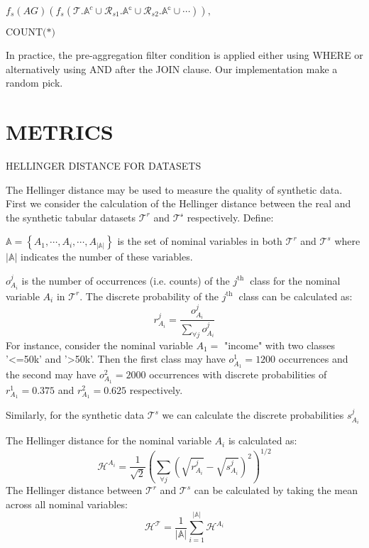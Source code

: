 \documentclass[10pt]{article}
\begin{document}
$f_s(AG)(f_s(\mathcal{T}.\mathbb{A}^c \cup \mathcal{R}_{s1}.\mathbb{{A}^c} \cup \mathcal{R}_{s2}.\mathbb{{A}^c} \cup \cdots )),$

$\text{COUNT(*)}$

In practice, the pre-aggregation filter condition is applied either using WHERE or alternatively using  AND after the JOIN clause. Our implementation make a random pick.   














\section{METRICS}
HELLINGER DISTANCE FOR DATASETS

The Hellinger distance may be used to measure the quality of synthetic data. First we consider the calculation of the Hellinger distance between the real and the synthetic tabular datasets $\mathcal{T}^{r}$ and $\mathcal{T}^{\mathcal{s}}$ respectively. Define:

$\mathbb{A}=\left\{A_{1}, \cdots, A_{i}, \cdots, A_{|\mathbb{A}|}\right\}$ is the set of nominal variables in both $\mathcal{T}^{r}$ and $\mathcal{T}^{s}$ where $|\mathbb{A}|$ indicates the number of these variables.

$o_{A_{i}}^{j}$ is the number of occurrences (i.e. counts) of the $j^{\text {th }}$ class for the nominal variable $A_{i}$ in $\mathcal{T}^{r}$. The discrete probability of the $j^{\text {th }}$ class can be calculated as:
$$
r_{A_{i}}^{j}=\frac{o_{A_{i}}^{j}}{\sum_{\forall j} o_{A_{i}}^{j}}
$$
For instance, consider the nominal variable $A_{1}=$ "income" with two classes '<=50k' and '>50k'. Then the first class may have $o_{A_{1}}^{1}=1200$ occurrences and the second may have $o_{A_{1}}^{2}=2000$ occurrences with discrete probabilities of $r_{A_{1}}^{1}=0.375$ and $r_{A_{1}}^{2}=0.625$ respectively.

Similarly, for the synthetic data $\mathcal{T}^{s}$ we can calculate the discrete probabilities $s_{A_{i}}^{j}$

The Hellinger distance for the nominal variable $A_{i}$ is calculated as:
$$
\mathcal{H}^{A_{i}}=\frac{1}{\sqrt{2}}\left(\sum_{\forall j}\left(\sqrt{r_{A_{i}}^{j}}-\sqrt{s_{A_{i}}^{j}}\right)^{2}\right)^{1 / 2}
$$
The Hellinger distance between $\mathcal{T}^{r}$ and $\mathcal{T}^{s}$ can be calculated by taking the mean across all nominal variables:
$$
\mathcal{H}^{\mathcal{T}}=\frac{1}{|\mathbb{A}|} \sum_{i=1}^{|\mathbb{A}|} \mathcal{H}^{A_{i}}
$$
\end{document}
